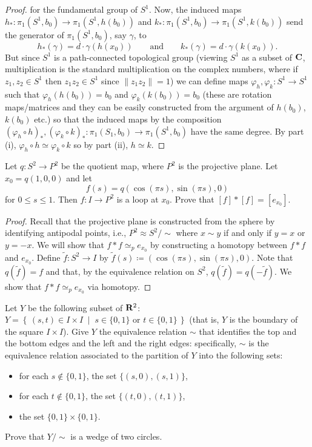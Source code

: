 \begin{proof}
for the fundamental group of $S^1$. Now, the induced maps
$h_*\colon\pi_1(S^1,b_0)\to\pi_1(S^1,h(b_0))$ and
$k_*\colon\pi_1(S^1,b_0)\to\pi_1(S^1,k(b_0))$ send the generator of
$\pi_1(S^1,b_0)$, say $\gamma$, to
\[
h_*(\gamma)=d\cdot\gamma(h(x_0))\qquad\text{and}\qquad
k_*(\gamma)=d\cdot\gamma(k(x_0)).
\]
But since $S^1$ is a path-connected topological group (viewing $S^1$ as a
subset of $\mathbf{C}$, multiplication is the standard multiplication on the
complex numbers, where if $z_1,z_2\in S^1$ then $z_1z_2\in S^1$ since
$\|z_1z_2\|=1$) we can define maps $\varphi_h,\varphi_k\colon S^1\to S^1$
such that $\varphi_h(h(b_0))=b_0$ and $\varphi_k(k(b_0))=b_0$ (these are
rotation maps/matrices and they can be easily constructed from the argument
of $h(b_0)$, $k(b_0)$ etc.) so that the induced maps by the composition
$(\varphi_h\circ h)_*,(\varphi_k\circ
k)_*\colon\pi_1(S_1,b_0)\to\pi_1(S^1,b_0)$ have the same degree. By part
(i), $\varphi_h\circ h\simeq\varphi_k\circ k$ so by part (ii), $h\simeq k$.
\end{proof}
\newpage
\begin{problem}[B]
Let $q\colon S^2\to P^2$ be the quotient map, where $P^2$ is the
projective plane. Let $x_0=q(1,0,0)$ and let
\[f(s)=q(\cos(\pi s),\sin(\pi s),0)\]
for $0\leq s\leq 1$. Then $f\colon I\to P^2$ is a loop at
$x_0$. Prove that $[f]*[f]=[e_{x_0}]$.
\end{problem}
\begin{proof}
Recall that the projective plane is constructed from the sphere by
identifying antipodal points, i.e., $P^2\approx S^2/{\sim}$ where $x\sim y$
if and only if $y=x$ or $y=-x$. We will show that $f*f\simeq_p e_{x_0}$ by
constructing a homotopy between $f*f$ and $e_{x_0}$. Define $\tilde f\colon
S^2\to I$ by $\tilde f(s)\coloneqq(\cos(\pi s),\sin(\pi s),0)$. Note that
$q(\tilde f)=f$ and that, by the equivalence relation on $S^2$, $q(\tilde
f)=q(-\tilde f)$. We show that $f*f\simeq_p e_{x_0}$ via homotopy.
\end{proof}
\newpage
\begin{problem}[C]
Let $Y$ be the following subset of $\mathbf{R}^2$: $Y=\left\{\,(s,t)\in
  I\times I\;\middle|\;\text{$s\in\{0,1\}$ or
    $t\in\{0,1\}$}\,\right\}$ (that is, $Y$ is the boundary of
the square $I\times I$). Give $Y$ the equivalence relation $\sim$
that identifies the top and the bottom edges and the left and the
right edges: specifically, $\sim$ is the equivalence relation
associated to the partition of $Y$ into the following sets:
\begin{itemize}
\item for each $s\notin\{0,1\}$, the set $\{(s,0),(s,1)\}$,
\item for each $t\notin\{0,1\}$, the set $\{(t,0),(t,1)\}$,
\item the set $\{0,1\}\times\{0,1\}$.
\end{itemize}
Prove that $Y/{\sim}$ is a wedge of two circles.
\end{problem}
